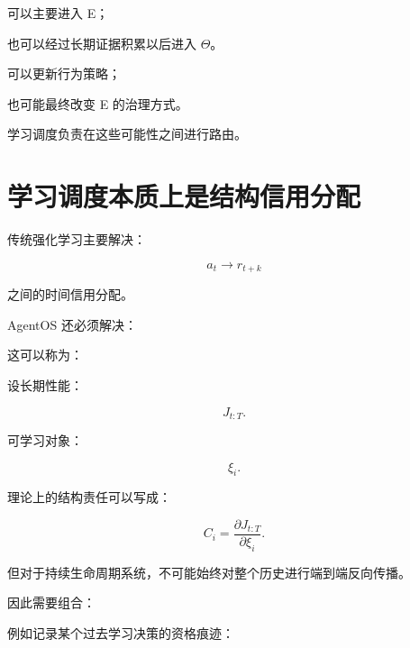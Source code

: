 可以主要进入 E；

也可以经过长期证据积累以后进入 \(\Theta\)。

\begin{statementbox}
\centering
{}
\end{statementbox}

可以更新行为策略；

也可能最终改变 E 的治理方式。

学习调度负责在这些可能性之间进行路由。


\section{学习调度本质上是结构信用分配}

传统强化学习主要解决：

\[
a_t
\rightarrow
r_{t+k}
\]

之间的时间信用分配。

AgentOS 还必须解决：

\begin{statementbox}
\centering
{}
\end{statementbox}

这可以称为：

\begin{statementbox}
\centering
{}
\end{statementbox}

设长期性能：

\[
J_{t:T}.
\]

可学习对象：

\[
\xi_i.
\]

理论上的结构责任可以写成：

\[
\boxed{
C_i
=
\frac{\partial J_{t:T}}
{\partial \xi_i}.
}
\]

但对于持续生命周期系统，不可能始终对整个历史进行端到端反向传播。

因此需要组合：

\begin{statementbox}
\centering
{}
\end{statementbox}

例如记录某个过去学习决策的资格痕迹：

